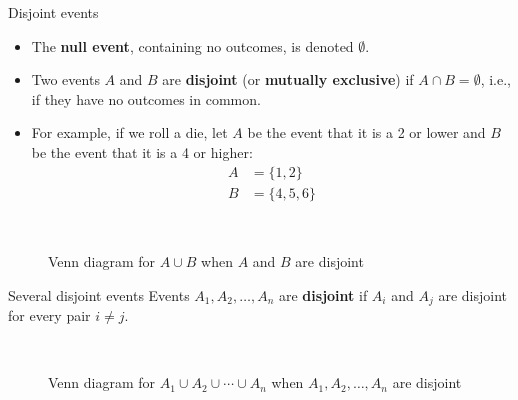 \documentclass[xcolor=table]{beamer}
\renewcommand{\emph}{\textbf}
\begin{document}
\begin{frame}{Disjoint events}
\begin{itemize}
\item The \emph{null event}, containing no outcomes, is denoted $\emptyset$.
\pause\item Two events $A$ and $B$ are \emph{disjoint} (or \emph{mutually exclusive}) if $A\cap B=\emptyset$, i.e., if they have no outcomes in common.
\pause\item For example, if we roll a die, let $A$ be the event that it is a 2 or lower and $B$ be the event that it is a 4 or higher:
\begin{align*}
A &= \{1,2\} \\
B &= \{4,5,6\}
\end{align*}
\end{itemize}

\begin{figure}
 \\
\caption{Venn diagram for $A \cup B$ when $A$ and $B$ are disjoint}
\end{figure}
\end{frame}

\begin{frame}{Several disjoint events}
Events $A_1,A_2,\dots,A_n$ are \emph{disjoint} if $A_i$ and $A_j$ are disjoint for every pair $i\neq j$.
\begin{figure}
 \\
\caption{Venn diagram for $A_1 \cup A_2 \cup \cdots \cup A_n$ when $A_1, A_2, \dots, A_n$ are disjoint}
\end{figure}
\end{frame}
\end{document}
